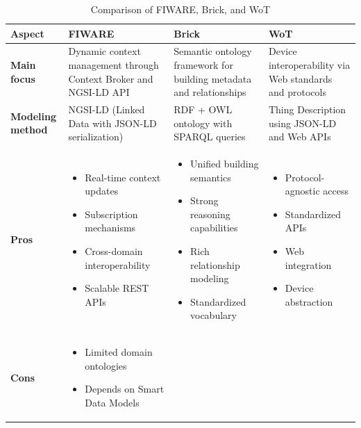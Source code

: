\begin{table}[htb]
\centering
\caption{Comparison of FIWARE, Brick, and WoT}
\label{tab:comparison}
\renewcommand{\arraystretch}{1.3} %
\begin{tabular}{|>{\raggedright\arraybackslash}p{2.8cm}|>{\raggedright\arraybackslash}p{4cm}|>{\raggedright\arraybackslash}p{4cm}|>{\raggedright\arraybackslash}p{4cm}|}
\hline
\textbf{Aspect} & \textbf{FIWARE} & \textbf{Brick} & \textbf{WoT} \\ 
\hline\hline
\textbf{Main focus} & 
Dynamic context management through Context Broker and NGSI-LD API & 
Semantic ontology framework for building metadata and relationships & 
Device interoperability via Web standards and protocols \\ 
\hline
\textbf{Modeling method} & 
NGSI-LD (Linked Data with JSON-LD serialization) & 
RDF + OWL ontology with SPARQL queries & 
Thing Description using JSON-LD and Web APIs \\ 
\hline
\textbf{Pros} & 
\begin{itemize}[leftmargin=*,nosep,after=\strut]
\item Real-time context updates
\item Subscription mechanisms
\item Cross-domain interoperability
\item Scalable REST APIs
\end{itemize} & 
\begin{itemize}[leftmargin=*,nosep,after=\strut]
\item Unified building semantics
\item Strong reasoning capabilities
\item Rich relationship modeling
\item Standardized vocabulary
\end{itemize} & 
\begin{itemize}[leftmargin=*,nosep,after=\strut]
\item Protocol-agnostic access
\item Standardized APIs
\item Web integration
\item Device abstraction
\end{itemize} \\ 
\hline
\textbf{Cons} & 
\begin{itemize}[leftmargin=*,nosep,after=\strut]
\item Limited domain ontologies
\item Depends on Smart Data Models

\end{itemize}
\end{tabular}
\end{table}
